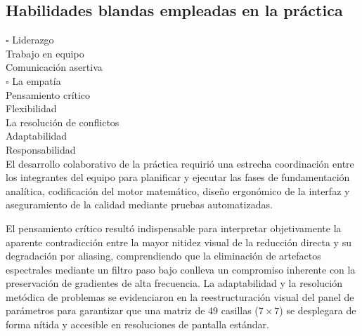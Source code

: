 \documentclass[11pt]{article}
\begin{document}
\subsection{Habilidades blandas empleadas en la práctica}
$\square$ Liderazgo \\
\boxtimes Trabajo en equipo \\
\boxtimes Comunicación asertiva \\
$\square$ La empatía \\
\boxtimes Pensamiento crítico \\
\boxtimes Flexibilidad \\
\boxtimes La resolución de conflictos \\
\boxtimes Adaptabilidad \\
\boxtimes Responsabilidad \\

El desarrollo colaborativo de la práctica requirió una estrecha coordinación entre los integrantes del equipo para planificar y ejecutar las fases de fundamentación analítica, codificación del motor matemático, diseño ergonómico de la interfaz y aseguramiento de la calidad mediante pruebas automatizadas.

El pensamiento crítico resultó indispensable para interpretar objetivamente la aparente contradicción entre la mayor nitidez visual de la reducción directa y su degradación por aliasing, comprendiendo que la eliminación de artefactos espectrales mediante un filtro paso bajo conlleva un compromiso inherente con la preservación de gradientes de alta frecuencia. La adaptabilidad y la resolución metódica de problemas se evidenciaron en la reestructuración visual del panel de parámetros para garantizar que una matriz de 49 casillas ($7\times7$) se desplegara de forma nítida y accesible en resoluciones de pantalla estándar.
\end{document}
